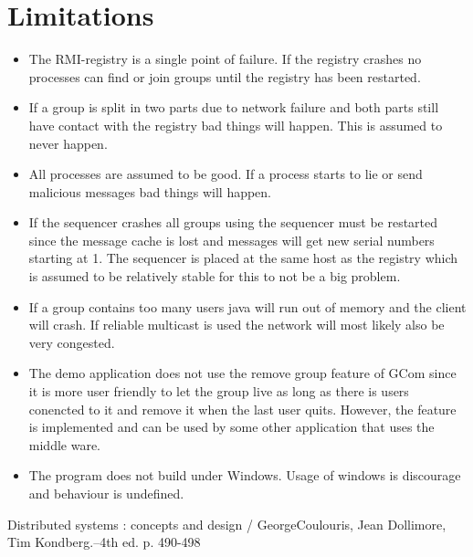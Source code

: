 \documentclass[english]{article}
\begin{document}
\section{Limitations}
\begin{itemize}
\item The RMI-registry is a single point of failure. If the registry crashes no processes can find or join groups until the registry has been restarted.

\item If a group is split in two parts due to network failure and both parts still have contact with the registry bad things will happen. This is assumed to never happen.

\item All processes are assumed to be good. If a process starts to lie or send malicious messages bad things will happen.

\item If the sequencer crashes all groups using the sequencer must be restarted since the message cache is lost and messages will get new serial numbers starting at 1. The sequencer is placed at the same host as the registry which is assumed to be relatively stable for this to not be a big problem.

\item If a group contains too many users java will run out of memory and the client will crash. If reliable multicast is used the network will most likely also be very congested.

\item The demo application does not use the remove group feature of GCom since it is more user friendly to let the group live as long as there is users conencted to it and remove it when the last user quits. However, the feature is implemented and can be used by some other application that uses the middle ware.

\item The program does not build under Windows. Usage of windows is discourage and behaviour is undefined.

\end{itemize}

\begin{thebibliography}{5}
 Distributed systems : concepts and design / GeorgeCoulouris, Jean Dollimore, Tim Kondberg.--4th ed. p. 490-498

\end{thebibliography}

\appendix
\end{document}
